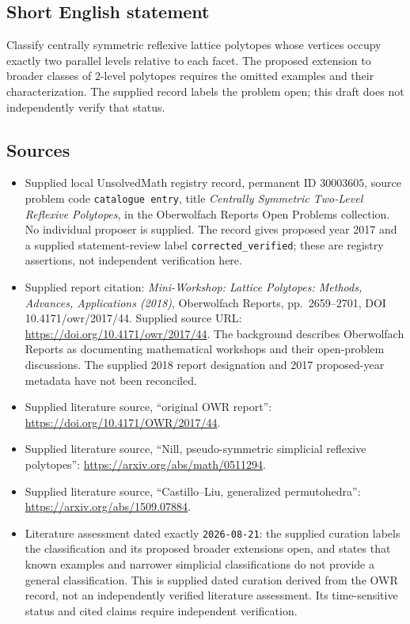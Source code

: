 \documentclass[11pt]{article}
\begin{document}
\subsection{Short English statement}
Classify centrally symmetric reflexive lattice polytopes whose vertices occupy exactly two parallel levels relative to each facet. The proposed extension to broader classes of \(2\)-level polytopes requires the omitted examples and their characterization. The supplied record labels the problem open; this draft does not independently verify that status.
\subsection{Sources}
\begin{itemize}
\item Supplied local UnsolvedMath registry record, permanent ID \(30003605\), source problem code \texttt{catalogue entry}, title \emph{Centrally Symmetric Two-Level Reflexive Polytopes}, in the Oberwolfach Reports Open Problems collection. No individual proposer is supplied. The record gives proposed year 2017 and a supplied statement-review label \texttt{corrected\_verified}; these are registry assertions, not independent verification here.
\item Supplied report citation: \emph{Mini-Workshop: Lattice Polytopes: Methods, Advances, Applications (2018)}, Oberwolfach Reports, pp.\ 2659--2701, DOI 10.4171/owr/2017/44. Supplied source URL: \url{https://doi.org/10.4171/owr/2017/44}. The background describes Oberwolfach Reports as documenting mathematical workshops and their open-problem discussions. The supplied 2018 report designation and 2017 proposed-year metadata have not been reconciled.
\item Supplied literature source, ``original OWR report'': \url{https://doi.org/10.4171/OWR/2017/44}.
\item Supplied literature source, ``Nill, pseudo-symmetric simplicial reflexive polytopes'': \url{https://arxiv.org/abs/math/0511294}.
\item Supplied literature source, ``Castillo--Liu, generalized permutohedra'': \url{https://arxiv.org/abs/1509.07884}.
\item Literature assessment dated exactly \texttt{2026-08-21}: the supplied curation labels the classification and its proposed broader extensions open, and states that known examples and narrower simplicial classifications do not provide a general classification. This is supplied dated curation derived from the OWR record, not an independently verified literature assessment. Its time-sensitive status and cited claims require independent verification.
\end{itemize}
\end{document}
